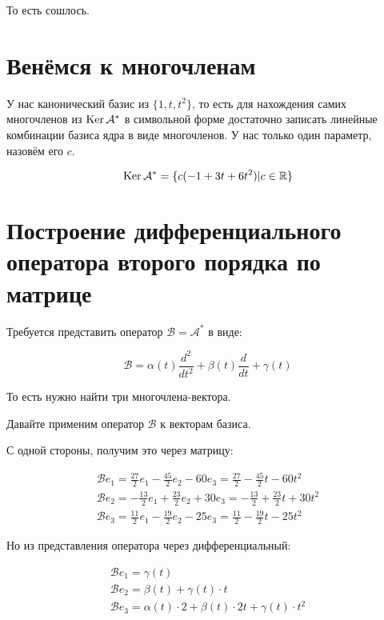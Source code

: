 \documentclass[12pt, a4paper]{article}
\begin{document}
    То есть сошлось.

    \section{Венёмся к многочленам}

    У нас канонический базис из $\{1, t, t^2\}$, то есть для нахождения самих многочленов из $\operatorname{Ker} \mathcal{A}^{*}$
    в символьной форме достаточно записать линейные комбинации базиса ядра в виде многочленов. У нас только один параметр, назовём его $c$.

    \begin{equation}
        \operatorname{Ker} \mathcal{A}^{*} = \{ c(-1 + 3t + 6t^2) | c \in {\mathbb{R}} \}
    \end{equation}


    \section{Построение дифференциального оператора второго порядка по матрице}

    Требуется представить оператор $\mathcal{B} = \mathcal{A}^*$ в виде:

    \begin{equation}
        \mathcal{B} = \alpha(t) \frac{d^{2}}{d t^{2}}+\beta(t) \frac{d}{d t}+\gamma(t)
    \end{equation}

    То есть нужно найти три многочлена-вектора.

    Давайте применим оператор $\mathcal{B}$ к векторам базиса.

    С одной стороны, получим это через матрицу:

    \begin{gather*}
        \mathcal{B} e_{1} = \frac{27}{2} e_{1} - \frac{45}{2} e_{2} - 60 e_{3} = \frac{27}{2} - \frac{45}{2} t - 60 t^2 \\
        \mathcal{B} e_{2} = -\frac{13}{2} e_{1} + \frac{23}{2} e_{2} + 30 e_{3} = -\frac{13}{2} + \frac{23}{2} t + 30 t^2 \\
        \mathcal{B} e_{3} = \frac{11}{2} e_{1} - \frac{19}{2} e_{2} - 25 e_{3} = \frac{11}{2} - \frac{19}{2} t - 25 t^2
    \end{gather*}

    Но из представления оператора через дифференциальный:

    \begin{gather*}
        \mathcal{B} e_{1}=\gamma(t) \\
        \mathcal{B} e_{2}=\beta(t)+\gamma(t) \cdot t \\
        \mathcal{B} e_{3}=\alpha(t) \cdot 2+\beta(t) \cdot 2 t+\gamma(t) \cdot t^{2}
    \end{gather*}    
\end{document}
